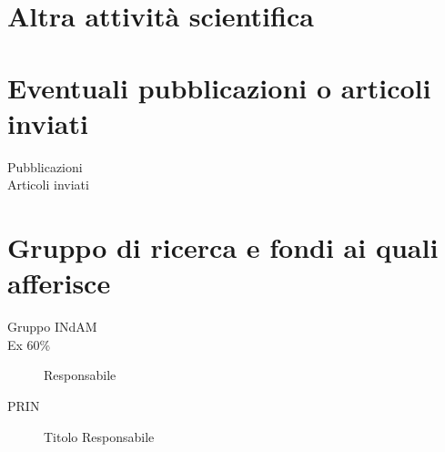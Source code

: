 \documentclass[11pt]{article}
\begin{document}
\section*{Altra attivit\`a scientifica}

\begin{description}

\item[%
] 

\end{description}


\section*{Eventuali pubblicazioni o articoli inviati}

\begin{description}


\item[Pubblicazioni] 


\item[Articoli inviati]





\end{description}




\section*{Gruppo di ricerca e fondi ai quali afferisce}

\begin{description}

\item[Gruppo INdAM] %

\item[Ex 60\%] Responsabile %

\item[PRIN] Titolo\hskip 2cm Responsabile %


\end{description}


\vfill
\end{document}
